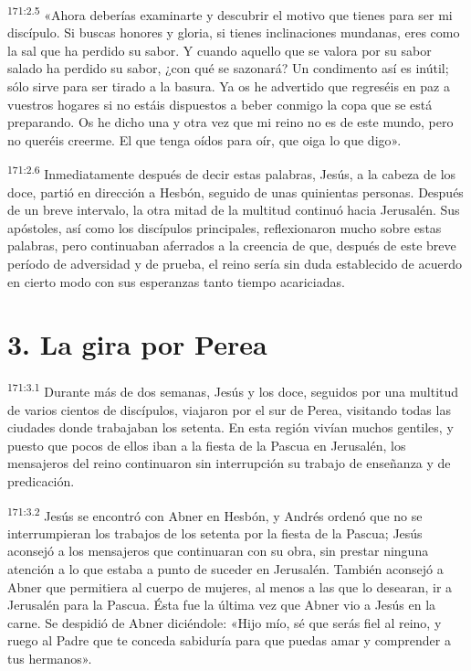 \par 
\textsuperscript{171:2.5} «Ahora deberías examinarte y descubrir el motivo que tienes para ser mi discípulo. Si buscas honores y gloria, si tienes inclinaciones mundanas, eres como la sal que ha perdido su sabor. Y cuando aquello que se valora por su sabor salado ha perdido su sabor, ¿con qué se sazonará? Un condimento así es inútil; sólo sirve para ser tirado a la basura. Ya os he advertido que regreséis en paz a vuestros hogares si no estáis dispuestos a beber conmigo la copa que se está preparando. Os he dicho una y otra vez que mi reino no es de este mundo, pero no queréis creerme. El que tenga oídos para oír, que oiga lo que digo».

\par 
\textsuperscript{171:2.6} Inmediatamente después de decir estas palabras, Jesús, a la cabeza de los doce, partió en dirección a Hesbón, seguido de unas quinientas personas. Después de un breve intervalo, la otra mitad de la multitud continuó hacia Jerusalén. Sus apóstoles, así como los discípulos principales, reflexionaron mucho sobre estas palabras, pero continuaban aferrados a la creencia de que, después de este breve período de adversidad y de prueba, el reino sería sin duda establecido de acuerdo en cierto modo con sus esperanzas tanto tiempo acariciadas.

\section*{3. La gira por Perea}
\par 
\textsuperscript{171:3.1} Durante más de dos semanas, Jesús y los doce, seguidos por una multitud de varios cientos de discípulos, viajaron por el sur de Perea, visitando todas las ciudades donde trabajaban los setenta. En esta región vivían muchos gentiles, y puesto que pocos de ellos iban a la fiesta de la Pascua en Jerusalén, los mensajeros del reino continuaron sin interrupción su trabajo de enseñanza y de predicación.

\par 
\textsuperscript{171:3.2} Jesús se encontró con Abner en Hesbón, y Andrés ordenó que no se interrumpieran los trabajos de los setenta por la fiesta de la Pascua; Jesús aconsejó a los mensajeros que continuaran con su obra, sin prestar ninguna atención a lo que estaba a punto de suceder en Jerusalén. También aconsejó a Abner que permitiera al cuerpo de mujeres, al menos a las que lo desearan, ir a Jerusalén para la Pascua. Ésta fue la última vez que Abner vio a Jesús en la carne. Se despidió de Abner diciéndole: «Hijo mío, sé que serás fiel al reino, y ruego al Padre que te conceda sabiduría para que puedas amar y comprender a tus hermanos».

